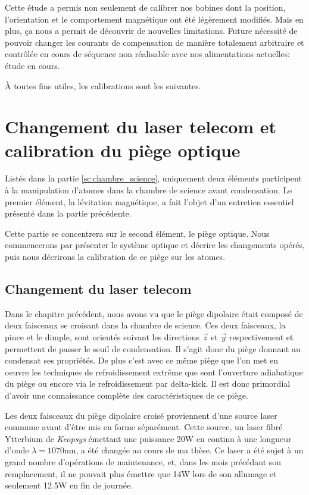 Cette étude a permis non seulement de calibrer nos bobines dont la position, l'orientation et le comportement magnétique ont été légèrement modifiés. Mais en plus, ça nous a permit de découvrir de nouvelles limitations. 
Future nécessité de pouvoir changer les courants de compensation de manière totalement arbitraire et contrôlée en cours de séquence non réalisable avec nos alimentations actuelles: étude en cours. 




À toutes fins utiles, les calibrations sont les suivantes.










\section{Changement du laser telecom et calibration du piège optique}
Listés dans la partie \ref{sc:chambre_science}, uniquement deux éléments participent à la manipulation d'atomes dans la chambre de science avant condensation. Le premier élément, la lévitation magnétique, a fait l'objet d'un entretien essentiel présenté dans la partie précédente. 

Cette partie se concentrera sur le second élément, le piège optique. Nous commencerons par présenter le système optique et décrire les changements opérés, puis nous décrirons la calibration de ce piège sur les atomes.

\subsection{Changement du laser telecom}
Dans le chapitre précédent, nous avons vu que le piège dipolaire était composé de deux faisceaux se croisant dans la chambre de science. Ces deux faisceaux, la pince et le dimple, sont orientés suivant les directions $\vec{z}$ et $\vec{y}$ respectivement et permettent de passer le seuil de condensation. Il s'agit donc du piège donnant au condensat ses propriétés. De plus c'est avec ce même piège que l'on met en oeuvre les techniques de refroidissement extrême que sont l'ouverture adiabatique du piège ou encore via le refroidissement par delta-kick. Il est donc primordial d'avoir une connaissance complète des caractéristiques de ce piège.

Les deux faisceaux du piège dipolaire croisé proviennent d'une source laser commune avant d'être mis en forme séparément. Cette source, un laser fibré Ytterbium de \emph{Keopsys} émettant une puissance 20W en continu à une longueur d'onde $\lambda=1070$nm, a été changée au cours de ma thèse. Ce laser a été sujet à un grand nombre d'opérations de maintenance, et, dans les mois précédant son remplacement, il ne pouvait plus émettre que 14W lors de son allumage et seulement 12.5W en fin de journée.
 
